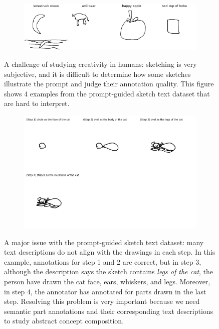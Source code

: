\begin{figure}[!htb]
\begin{subfigure}{\textwidth}
\centering
\includegraphics[width=\linewidth]{data_collection/v1_hard_to_understand_sketches.png}  
\end{subfigure}
\caption{A challenge of studying creativity in humans: sketching is very subjective, and it is difficult to determine how some sketches illustrate the prompt and judge their annotation quality. This figure shows 4 examples from the prompt-guided sketch text dataset that are hard to interpret.}
\label{v1.hard_to_understand}
\end{figure}

\begin{figure}[!htb]
\begin{subfigure}{\textwidth}
\centering
\includegraphics[width=\linewidth]{data_collection/v1_misalign_text_drawing.png}  
\end{subfigure}
\caption{A major issue with the prompt-guided sketch text dataset: many text descriptions do not align with the drawings in each step. In this example, annotations for step 1 and 2 are correct, but in step 3, although the description says the sketch contains \textit{legs of the cat}, the person have drawn the cat face, ears, whiskers, and legs. Moreover, in step 4, the annotator has annotated for parts drawn in the last step. Resolving this problem is very important because we need semantic part annotations and their corresponding text descriptions to study abstract concept composition.}
\label{v1.misalign}
\end{figure}


